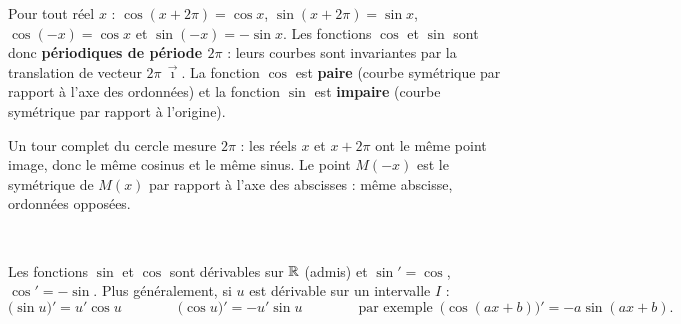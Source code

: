 \begin{propriete}
Pour tout réel $x$ : $\cos(x+2\pi)=\cos x$, $\sin(x+2\pi)=\sin x$, $\cos(-x)=\cos x$ et $\sin(-x)=-\sin x$. Les fonctions $\cos$ et
$\sin$ sont donc \textbf{périodiques de période $2\pi$} : leurs courbes sont invariantes par la translation de vecteur
$2\pi\,\vec\imath$. La fonction $\cos$ est \textbf{paire} (courbe symétrique par rapport à l'axe des ordonnées) et la fonction
$\sin$ est \textbf{impaire} (courbe symétrique par rapport à l'origine).
\end{propriete}

\begin{demonstration}
Un tour complet du cercle mesure $2\pi$ : les réels $x$ et $x+2\pi$ ont le même point image, donc le même cosinus et le même
sinus. Le point $M(-x)$ est le symétrique de $M(x)$ par rapport à l'axe des abscisses : même abscisse, ordonnées opposées.
\end{demonstration}

\begin{center}
\\[0.5mm]
\end{center}

\begin{theoreme}[Dérivées]
Les fonctions $\sin$ et $\cos$ sont dérivables sur $\mathbb{R}$ (admis) et $\sin'=\cos$, $\cos'=-\sin$. Plus généralement, si $u$
est dérivable sur un intervalle $I$ :
\[ \big(\sin u\big)'=u'\cos u \qquad\qquad \big(\cos u\big)'=-u'\sin u \qquad\qquad
   \text{par exemple}\enspace \big(\cos(ax+b)\big)'=-a\sin(ax+b). \]
\end{theoreme}


